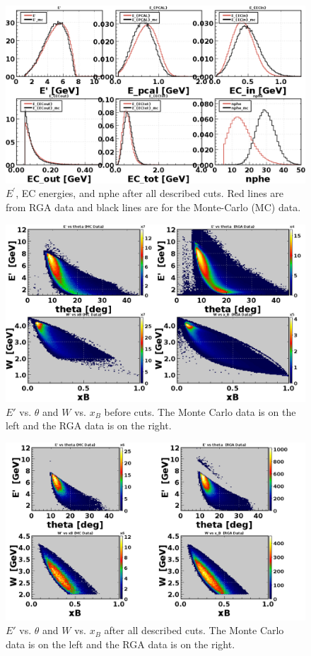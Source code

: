 \begin{figure}[h!]
	\centering
	\includegraphics[width=0.9\linewidth]{figures/rga/energies.png}
	\caption{$E^{\prime}$, EC energies, and nphe after all described cuts. Red lines are from RGA data and black lines are for the Monte-Carlo (MC) data.}
	\label{fig:rga_energies}
\end{figure}

\newpage
\begin{figure}[h!]
	\centering
	\includegraphics[width=0.9\linewidth]{figures/rga/uncut/2Dkin1.png}
	\caption{$E'$ vs. $\theta$ and $W$ vs. $x_B$ before cuts. The Monte Carlo data is on the left and the RGA data is on the right.}
	\label{fig:rga_2Dkin1_uncut}
\end{figure}

\begin{figure}[h!]
	\centering
	\includegraphics[width=0.9\linewidth]{figures/rga/2Dkin1.png}
	\caption{$E'$ vs. $\theta$ and $W$ vs. $x_B$ after all described cuts. The Monte Carlo data is on the left and the RGA data is on the right.}
	\label{fig:rga_2Dkin1}
\end{figure}

